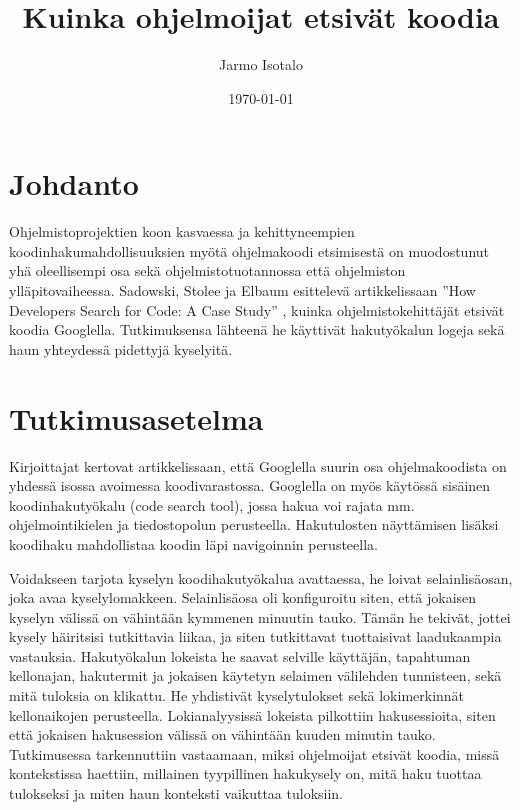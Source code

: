 \documentclass[finnish]{../tktltiki2}
\title{Kuinka ohjelmoijat etsivät koodia}
\author{Jarmo Isotalo}
\date{\today}
\theoremstyle{definition}
\theoremstyle{remark}
\begin{document}

\frontmatter      %

\maketitle        %

\tableofcontents  %


\mainmatter       %

\section{Johdanto}

Ohjelmistoprojektien koon kasvaessa ja kehittyneempien koodinhakumahdollisuuksien myötä ohjelmakoodi etsimisestä on muodostunut yhä oleellisempi osa sekä ohjelmistotuotannossa että ohjelmiston ylläpitovaiheessa. Sadowski, Stolee ja Elbaum esittelevä artikkelissaan ''How Developers Search for Code: A Case Study'' \cite{g_search_code}, kuinka ohjelmistokehittäjät etsivät koodia Googlella.
Tutkimuksensa lähteenä he käyttivät hakutyökalun logeja sekä haun yhteydessä pidettyjä kyselyitä.

\section{Tutkimusasetelma}

Kirjoittajat kertovat artikkelissaan, että Googlella suurin osa ohjelmakoodista on yhdessä isossa avoimessa koodivarastossa. Googlella on myös käytössä sisäinen koodinhakutyökalu (code search tool), jossa hakua voi rajata mm. ohjelmointikielen ja tiedostopolun perusteella. Hakutulosten näyttämisen lisäksi koodihaku mahdollistaa koodin läpi navigoinnin perusteella.

Voidakseen tarjota kyselyn koodihakutyökalua avattaessa, he loivat selainlisäosan, joka avaa kyselylomakkeen. Selainlisäosa oli konfiguroitu siten, että jokaisen kyselyn välissä on vähintään kymmenen minuutin tauko. Tämän he tekivät, jottei kysely häiritsisi tutkittavia liikaa, ja siten tutkittavat tuottaisivat laadukaampia vastauksia. Hakutyökalun lokeista he saavat selville käyttäjän, tapahtuman kellonajan, hakutermit ja jokaisen käytetyn selaimen välilehden tunnisteen, sekä mitä tuloksia on klikattu. He yhdistivät kyselytulokset sekä lokimerkinnät kellonaikojen perusteella.
Lokianalyysissä lokeista pilkottiin hakusessioita, siten että jokaisen hakusession välissä on vähintään kuuden minutin tauko.
Tutkimusessa tarkennuttiin vastaamaan, miksi ohjelmoijat etsivät koodia, missä kontekstissa haettiin, millainen tyypillinen hakukysely on, mitä haku tuottaa tulokseksi ja miten haun konteksti vaikuttaa tuloksiin.
\end{document}
